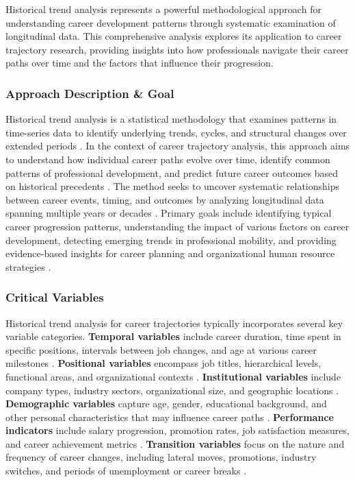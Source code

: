 \documentclass[../main.tex]{subfiles}
\begin{document}
Historical trend analysis represents a powerful methodological approach for understanding career development patterns through systematic examination of longitudinal data. This comprehensive analysis explores its application to career trajectory research, providing insights into how professionals navigate their career paths over time and the factors that influence their progression.

\subsubsection{Approach Description \& Goal}

Historical trend analysis is a statistical methodology that examines patterns in time-series data to identify underlying trends, cycles, and structural changes over extended periods \citep{investopedia2023, netsuite2023}. In the context of career trajectory analysis, this approach aims to understand how individual career paths evolve over time, identify common patterns of professional development, and predict future career outcomes based on historical precedents \citep{shermon2011}. The method seeks to uncover systematic relationships between career events, timing, and outcomes by analyzing longitudinal data spanning multiple years or decades \citep{shamrck2023}. Primary goals include identifying typical career progression patterns, understanding the impact of various factors on career development, detecting emerging trends in professional mobility, and providing evidence-based insights for career planning and organizational human resource strategies \citep{nature2023}.

\subsubsection{Critical Variables}

Historical trend analysis for career trajectories typically incorporates several key variable categories. \textbf{Temporal variables} include career duration, time spent in specific positions, intervals between job changes, and age at various career milestones \citep{wang2021, haas2006}. \textbf{Positional variables} encompass job titles, hierarchical levels, functional areas, and organizational contexts \citep{nature2023, pmc2020}. \textbf{Institutional variables} include company types, industry sectors, organizational size, and geographic locations \citep{pmc2020}. \textbf{Demographic variables} capture age, gender, educational background, and other personal characteristics that may influence career paths \citep{haas2006, nature2023}. \textbf{Performance indicators} include salary progression, promotion rates, job satisfaction measures, and career achievement metrics \citep{carnegie2018}. \textbf{Transition variables} focus on the nature and frequency of career changes, including lateral moves, promotions, industry switches, and periods of unemployment or career breaks \citep{pmc2020, carnegie2018}.
\end{document}
